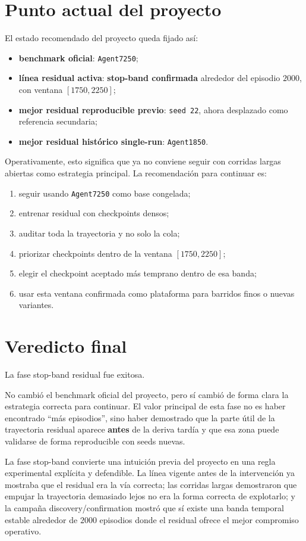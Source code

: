 \documentclass[11pt,a4paper]{article}
\begin{document}
\section*{Punto actual del proyecto}
El estado recomendado del proyecto queda fijado as\'i:
\begin{itemize}
\item \textbf{benchmark oficial}: \texttt{Agent7250};
\item \textbf{l\'inea residual activa}: \textbf{stop-band confirmada} alrededor del episodio \(2000\), con ventana \([1750,2250]\);
\item \textbf{mejor residual reproducible previo}: \texttt{seed 22}, ahora desplazado como referencia secundaria;
\item \textbf{mejor residual hist\'orico single-run}: \texttt{Agent1850}.
\end{itemize}

Operativamente, esto significa que ya no conviene seguir con corridas largas abiertas como estrategia principal. La recomendaci\'on para continuar es:
\begin{enumerate}
\item seguir usando \texttt{Agent7250} como base congelada;
\item entrenar residual con checkpoints densos;
\item auditar toda la trayectoria y no solo la cola;
\item priorizar checkpoints dentro de la ventana \([1750,2250]\);
\item elegir el checkpoint aceptado m\'as temprano dentro de esa banda;
\item usar esta ventana confirmada como plataforma para barridos finos o nuevas variantes.
\end{enumerate}

\section*{Veredicto final}
La fase stop-band residual fue exitosa.

No cambi\'o el benchmark oficial del proyecto, pero s\'i cambi\'o de forma clara la estrategia correcta para continuar. El valor principal de esta fase no es haber encontrado ``m\'as episodios'', sino haber demostrado que la parte \'util de la trayectoria residual aparece \textbf{antes} de la deriva tard\'ia y que esa zona puede validarse de forma reproducible con seeds nuevas.

La fase stop-band convierte una intuici\'on previa del proyecto en una regla experimental expl\'icita y defendible. La l\'inea vigente antes de la intervenci\'on ya mostraba que el residual era la v\'ia correcta; las corridas largas demostraron que empujar la trayectoria demasiado lejos no era la forma correcta de explotarlo; y la campa\~na discovery/confirmation mostr\'o que s\'i existe una banda temporal estable alrededor de \(2000\) episodios donde el residual ofrece el mejor compromiso operativo.



\end{document}
